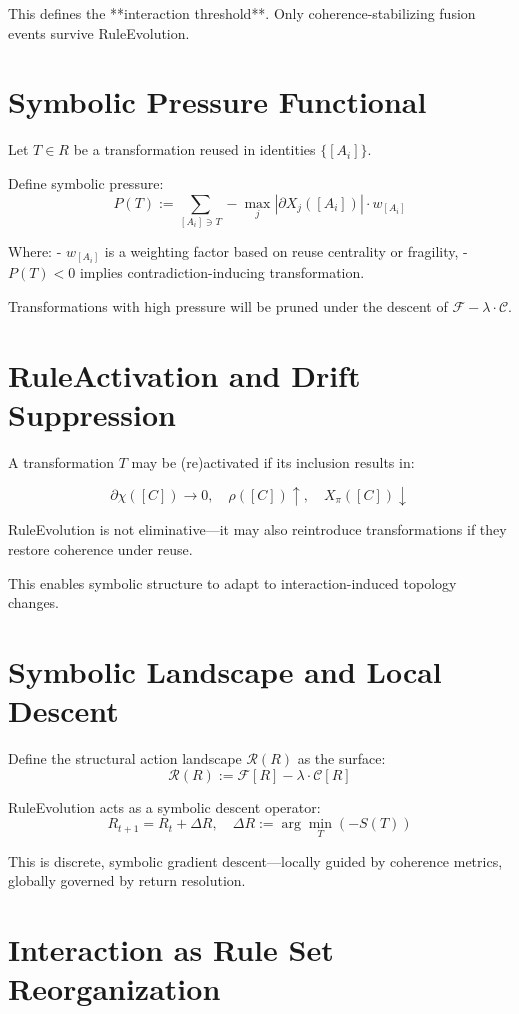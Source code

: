 This defines the **interaction threshold**. Only coherence-stabilizing fusion events survive RuleEvolution.

\section{Symbolic Pressure Functional} \label{sec:symbolic-pressure}

Let $T \in R$ be a transformation reused in identities $\{[A_i]\}$.

Define symbolic pressure:
\[
P(T) := \sum_{[A_i] \ni T} - \max_j |\partial X_j([A_i])| \cdot w_{[A_i]}
\]

Where:
- $w_{[A_i]}$ is a weighting factor based on reuse centrality or fragility,
- $P(T) < 0$ implies contradiction-inducing transformation.

Transformations with high pressure will be pruned under the descent of $\mathcal{F} - \lambda \cdot \mathcal{C}$.

\section{RuleActivation and Drift Suppression} \label{sec:ruleactivation}

A transformation $T$ may be (re)activated if its inclusion results in:

\[
\partial\chi([C]) \to 0,\quad
\rho([C]) \uparrow,\quad
X_\pi([C]) \downarrow
\]

RuleEvolution is not eliminative—it may also reintroduce transformations if they restore coherence under reuse.

This enables symbolic structure to adapt to interaction-induced topology changes.

\section{Symbolic Landscape and Local Descent} \label{sec:structural-landscape}

Define the structural action landscape $\mathcal{R}(R)$ as the surface:
\[
\mathcal{R}(R) := \mathcal{F}[R] - \lambda \cdot \mathcal{C}[R]
\]

RuleEvolution acts as a symbolic descent operator:
\[
R_{t+1} = R_t + \Delta R,\quad \Delta R := \arg\min_T (-S(T))
\]

This is discrete, symbolic gradient descent—locally guided by coherence metrics, globally governed by return resolution.

\section{Interaction as Rule Set Reorganization} \label{sec:interaction-restructuring}

